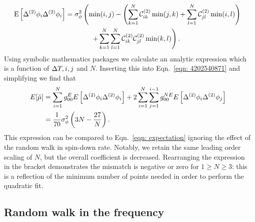 \begin{align}
\E{\Delta^{(2)}\phi_{i}\Delta^{(2)}\phi_{i}} & =
\sigma^{2}_{\phi} \left(\min(i, j) - \left(\s{k=1}{N}\CT_{ik} \min(j, k)
+ \s{l=1}{N}\CT_{jl}\min(i, l) \right)\right. \notag \\
& \hspace{13mm} \left. + \s{k=1}{N}\s{l=1}{N}\CT_{ik}\CT_{jl}\min(k, l)\right).
\label{eqn: expected mismatch dP0idP0j_k2}
\end{align}
Using symbolic mathematics packages we
calculate an analytic expression which is a function of $\Delta T, i, j$ and $N$.
Inserting this into Eqn.~\eqref{eqn: 4202540871} and simplifying we find that
\begin{align}
E[\tilde{\mu}]  & = \sum_{i=1}^{N}g_{00}^{E} E\left[\Delta^{(2)}\phi_{i}\Delta^{(2)}\phi_{i}\right]
+ 2 \sum_{i=1}^{N}\sum_{j=1}^{i-1}g_{00}^{NE}E\left[\Delta^{(2)}\phi_{i}\Delta^{(2)}\phi_{j}\right]  \\
& = \frac{1}{70}\sigma_{\phi}^{2}\left(3N - \frac{27}{N}\right).
\label{eqn: Expected mismatch RW in phase k2}
\end{align}
This expression can be compared to Eqn.~\eqref{eqn: expectation} ignoring the
effect of the random walk in spin-down rate. Notably, we retain the same
leading order scaling of $N$, but the overall coefficient is decreased.
Rearranging the expression in the bracket demonstrates the mismatch is negative
or zero for $1 \ge N \ge 3$: this is a reflection of the minimum number of
points needed in order to perform the quadratic fit.

\subsection{Random walk in the frequency}

